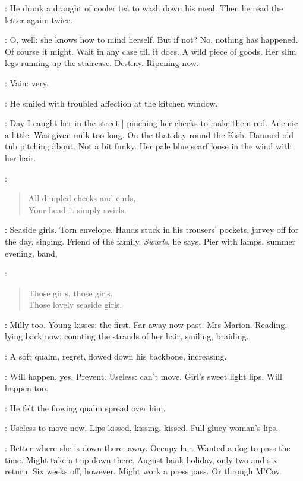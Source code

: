 :
He drank a draught of cooler tea to wash down his meal.
Then he read the letter again:
twice.

\BloomInt:
O, well: she knows how to mind herself.
But if not?
No, nothing has happened.
Of course it might.
Wait in any case till it does.
A wild piece of goods.
Her slim legs running up the staircase.
Destiny.
Ripening now.

\BloomInt:
Vain: very.

:
He smiled with troubled affection at the kitchen window.

\BloomInt:
Day I caught her in the street |
pinching her cheeks to make them red.
Anemic a little.
Was given milk too long.
On the  that day round the Kish.
Damned old tub pitching about.
Not a bit funky.
Her pale blue scarf loose in the wind with her hair.

\BloomInt:
\begin{verse}
    All dimpled cheeks and curls, \\
    Your head it simply swirls.
\end{verse}

\BloomInt:
Seaside girls.
Torn envelope.
Hands stuck in his trousers' pockets,
jarvey off for the day, singing.
Friend of the family.
\emph{Swurls}, he says.
Pier with lamps, summer evening, band,

\BloomInt:
\begin{verse}
    Those girls, those girls, \\
    Those lovely seaside girls.
\end{verse}

\BloomInt:
Milly too.
Young kisses:
the first.
Far away now past.
Mrs Marion.
Reading,
lying back now, counting the strands of her hair,
smiling, braiding.

:
A soft qualm, regret,
flowed down his backbone,
increasing.

\BloomInt:
Will happen, yes.
Prevent.
Useless: can't move.
Girl's sweet light lips.
Will happen too.

:
He felt the flowing qualm spread over him.

\BloomInt:
Useless to move now.
Lips kissed, kissing, kissed.
Full gluey woman's lips.

\BloomInt:
Better where she is down there: away.
Occupy her.
Wanted a dog to pass the time.
Might take a trip down there.
August bank holiday, only two and six return.
Six weeks off, however.
Might work a press pass.
Or through M'Coy.


